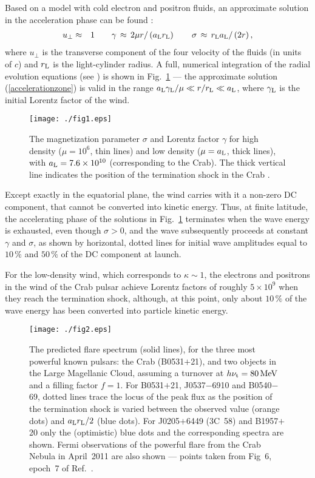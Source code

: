 \documentclass{PoS}
\begin{document}
Based on a model with cold electron and positron fluids, an 
approximate solution in the acceleration phase 
can be found \cite{kirkmochol11}:
\begin{eqnarray}
u_\bot&\approx&1\qquad
\gamma\,\approx\,2\mu r/\left(a_{\rm L}r_{\rm L}\right)
\qquad \sigma\,\approx\,r_{\rm L}a_{\rm L}/\left(2r\right),
\label{accelerationzone}
\end{eqnarray}
where $u_\bot$ is 
the transverse component of the four velocity of the fluids (in units of $c$) and 
$r_{\rm L}$ is the light-cylinder radius. A full, numerical integration of the 
radial evolution equations (see \cite{kirkgiacinti17}) 
is shown in Fig.~\ref{fig1} --- the approximate solution
(\ref{accelerationzone}) is valid in the range 
$a_{\rm L}\gamma_{\rm L}/\mu\ll r/r_{\rm L}\ll a_{\rm L}$, where
$\gamma_{\rm L}$ is the initial Lorentz factor of the wind. 
\begin{figure}
\texttt{[image: ./fig1.eps]}
\caption{\label{fig1}%
The magnetization 
parameter 
$\sigma$ and Lorentz factor $\gamma$  
for high density ($\mu=10^6$, thin lines) and low 
density ($\mu=a_{\rm L}$, thick lines), with 
$a_{\rm L}=7.6\times 10^{10}$ (corresponding to the Crab). 
The thick vertical line indicates the position of the 
termination shock in the Crab \cite{hesteretal02}.
}
\end{figure}
Except exactly in the equatorial plane, the wind carries with it a
non-zero DC component, that cannot be converted into kinetic
energy. Thus, at finite latitude, 
the accelerating phase of the solutions in Fig.~\ref{fig1} 
terminates when the wave energy is exhausted, even though $\sigma>0$, 
and the wave subsequently 
proceeds at constant $\gamma$ and $\sigma$, as shown by horizontal, 
dotted lines for initial wave amplitudes equal to 
$10\,\%$ and $50\,\%$ of the DC component at launch. 

For the low-density wind, which corresponds to $\kappa\sim 1$, the electrons and 
positrons in the wind of the Crab pulsar achieve Lorentz factors of roughly 
$5\times10^9$ when they reach the termination shock, although, 
at this point, only 
about $10\,\%$ of the wave energy has been converted into particle kinetic 
energy. 


\begin{figure}
\texttt{[image: ./fig2.eps]}
\caption{\label{fig2}%
The predicted flare spectrum (solid lines), for the 
three most powerful known pulsars: the Crab 
(B0531$+$21), and two objects in the Large Magellanic Cloud, assuming 
a turnover at $h\nu_{\rm t}=80\,\textrm{MeV}$  
and a filling factor $f=1$.  
For B0531$+$21, J0537$-$6910 and B0540$-$69, dotted lines trace the locus of  
the peak flux as the position of the termination shock is varied between 
the observed value (orange dots)  and $a_{\rm L}r_{\rm L}/2$ 
(blue dots). For J0205$+$6449 (3C~58) and B1957$+$20 only the (optimistic) blue dots and
the corresponding spectra are shown.
Fermi observations of the powerful flare from the Crab Nebula 
in April~2011 are also shown --- 
points taken from Fig~6, epoch~7 of Ref.~\cite{buehleretal12}.
}
\end{figure}
\end{document}
